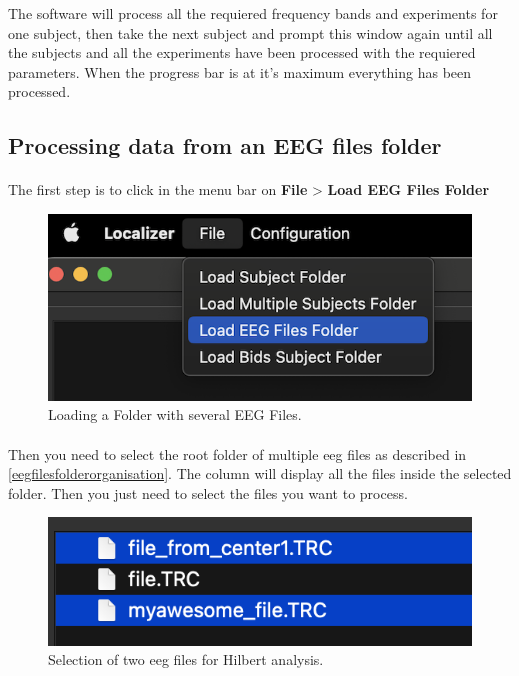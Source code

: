 \documentclass[a4paper]{article}
\begin{document}
The software will process all the requiered frequency bands and experiments for one subject,  then take the next subject and prompt this window again until all the subjects and all the experiments have been processed with the requiered parameters. When the progress bar is at it's maximum everything has been processed.

\subsection{Processing data from an EEG files folder}
\paragraph{} The first step is to click in the menu bar on \textbf{File} > \textbf{Load EEG Files Folder}
\begin{figure}[H]
\begin{center}
\includegraphics[scale=0.6]{SelectLoadEEGFolder.png}
\end{center}
\caption{\label{LoadEEGFolder}Loading a Folder with several EEG Files.}
\end{figure}

\paragraph{} Then you need to select the root folder of multiple eeg files as described in \ref{eegfilesfolderorganisation}. The column will display all the files inside the selected folder.  Then you just need to select the files you want to process.

\begin{figure}[H]
\begin{center}
\includegraphics[scale=0.8]{MiscEEGSelect.png}
\end{center}
\caption{\label{MiscFolderSelectionUI}Selection of two eeg files for Hilbert analysis.}
\end{figure}
\end{document}
